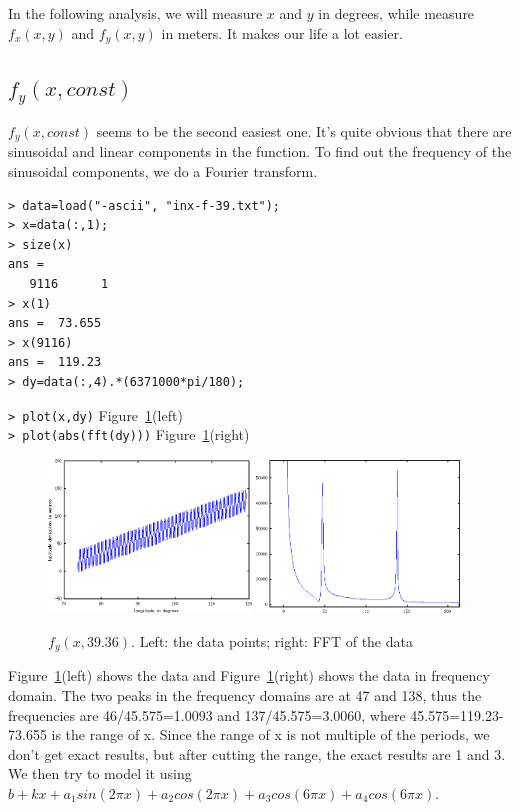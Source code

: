 \documentclass[a4paper]{article}
\begin{document}
In the following analysis, we will measure $x$ and $y$ in degrees, while
measure $f_x(x,y)$ and $f_y(x,y)$ in meters. It makes our life a lot easier.

\subsection{$f_y(x, const)$}
$f_y(x, const)$ seems to be the second easiest one. It's quite obvious that
there are sinusoidal and linear components in the function. To find out the
frequency of the sinusoidal components, we do a Fourier transform.

\begin{verbatim}
> data=load("-ascii", "inx-f-39.txt");
> x=data(:,1);
> size(x)
ans =
   9116      1
> x(1)
ans =  73.655
> x(9116)
ans =  119.23
> dy=data(:,4).*(6371000*pi/180);
\end{verbatim}
\verb|> plot(x,dy)| \hfill Figure~\ref{fig:fyx-fft}(left) \\
\verb|> plot(abs(fft(dy)))| \hfill Figure~\ref{fig:fyx-fft}(right)

\begin{figure}[htb]
\begin{center}
\includegraphics[width=0.48\textwidth]{fyx-data.png}
\includegraphics[width=0.48\textwidth]{fyx-fft.png}
\end{center}
\caption{$f_y(x,39.36)$. Left: the data points; right: FFT of the data}
\label{fig:fyx-fft}
\end{figure}

Figure~\ref{fig:fyx-fft}(left) shows the data and
Figure~\ref{fig:fyx-fft}(right) shows the data in frequency domain.
The two peaks in the frequency domains are at 47 and 138,
thus the frequencies are 46/45.575=1.0093 and 137/45.575=3.0060, where
45.575=119.23-73.655 is the range of x.
Since the range of x is not multiple of the periods, we don't get exact
results, but after cutting the range, the exact results are 1 and 3.
We then try to model it using $b+kx+a_1sin(2\pi x)+a_2cos(2\pi x)+a_3cos(6\pi
x)+a_4cos(6\pi x)$.
\end{document}
